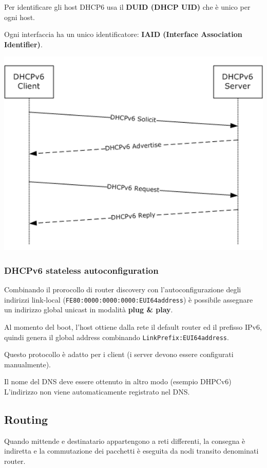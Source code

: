             Per identificare gli host DHCP6 usa il \textbf{DUID (DHCP UID)} che è unico per ogni host.

            Ogni interfaccia ha un unico identificatore: \textbf{IAID (Interface Association Identifier)}.

            \begin{center}
                \includegraphics[scale=0.45]{chapters/4/assets/schema_m.png}
            \end{center}

        \subsubsection{DHCPv6 stateless autoconfiguration}
            Combinando il prorocollo di router discovery con l'autoconfigurazione degli indirizzi link-local (\verb-FE80:0000:0000:0000:EUI64address-) è possibile assegnare un indirizzo global unicast in modalità \textbf{plug \& play}.
        
            Al momento del boot, l'host ottiene dalla rete il default router ed il prefisso IPv6, quindi genera il global address combinando \verb-LinkPrefix:EUI64address-.
        
            Questo protocollo è adatto per i client (i server devono essere configurati manualmente).
        
            Il nome del DNS deve essere ottenuto in altro modo (esempio DHPCv6) L'indirizzo non viene automaticamente registrato nel DNS.

    \subsection{Routing}
        Quando mittende e destinatario appartengono a reti differenti, la consegna è indiretta e la commutazione dei pacchetti è eseguita da nodi transito denominati router.

